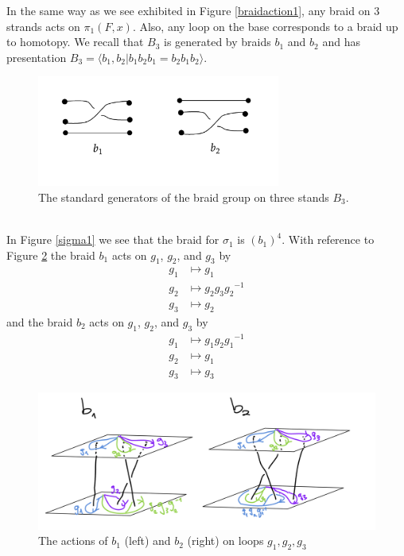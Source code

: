 \documentclass[oneside,reqno]{amsart}
\theoremstyle{definition}
\theoremstyle{definition}
\theoremstyle{definition}
\theoremstyle{definition}
\begin{document}
In the same way as we see exhibited in Figure \ref{braidaction1}, any braid on 3 strands acts on $\pi_1(F,x)$. Also, any loop on the base corresponds to a braid up to homotopy. We recall that $B_3$ is generated by braids $b_1$ and $b_2$ and has presentation $B_3 = \langle b_1,b_2 | b_1 b_2 b_1 = b_2 b_1 b_2\rangle$.
\begin{figure}[!h]
    \centering
    \includegraphics[width=8cm]{rank2exmp/B3.png}
    \caption{The standard generators of the braid group on three stands $B_3$.}
    \label{braidgenerators}
\end{figure}\\
\newline
In Figure \ref{sigma1} we see that the braid for $\sigma_1$ is $(b_1)^4$. With reference to Figure \ref{braidgenaction} the braid $b_1$ acts on $g_1$, $g_2$, and $g_3$ by
\begin{align*}
    g_1 &\mapsto g_1 \\
    g_2 &\mapsto g_2 g_3 {g_2}^{-1} \\
    g_3 &\mapsto g_2 
\end{align*}
and the braid $b_2$ acts on $g_1$, $g_2$, and $g_3$ by
\begin{align*}
    g_1 &\mapsto g_1 g_2 {g_1}^{-1} \\
    g_2 &\mapsto g_1 \\
    g_3 &\mapsto g_3
\end{align*}
\begin{figure}[!h]
    \centering
    \includegraphics[width=14cm]{rank2exmp/braidgenerators.png}
    \caption{The actions of $b_1$ (left) and $b_2$ (right) on loops $g_1,g_2,g_3$}
    \label{braidgenaction}
\end{figure}
\end{document}

